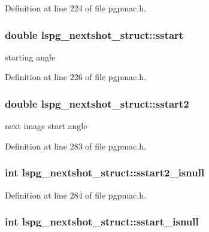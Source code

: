 Definition at line 224 of file pgpmac.\-h.

\hypertarget{structlspg__nextshot__struct_a8dc11eaa094d59f61642c4abc226918f}{
\subsubsection[{sstart}]{\setlength{\rightskip}{0pt plus 5cm}double lspg\-\_\-nextshot\-\_\-struct\-::sstart}}\label{structlspg__nextshot__struct_a8dc11eaa094d59f61642c4abc226918f}


starting angle 



Definition at line 226 of file pgpmac.\-h.

\hypertarget{structlspg__nextshot__struct_a8445cbd2206dc6d62b6bd433f5218c98}{
\subsubsection[{sstart2}]{\setlength{\rightskip}{0pt plus 5cm}double lspg\-\_\-nextshot\-\_\-struct\-::sstart2}}\label{structlspg__nextshot__struct_a8445cbd2206dc6d62b6bd433f5218c98}


next image start angle 



Definition at line 283 of file pgpmac.\-h.

\hypertarget{structlspg__nextshot__struct_a240c8532d5ce48dbc872d5123a4e721c}{
\subsubsection[{sstart2\-\_\-isnull}]{\setlength{\rightskip}{0pt plus 5cm}int lspg\-\_\-nextshot\-\_\-struct\-::sstart2\-\_\-isnull}}\label{structlspg__nextshot__struct_a240c8532d5ce48dbc872d5123a4e721c}


Definition at line 284 of file pgpmac.\-h.

\hypertarget{structlspg__nextshot__struct_aa53094de91e2f69d7174ab119df1cdac}{
\subsubsection[{sstart\-\_\-isnull}]{\setlength{\rightskip}{0pt plus 5cm}int lspg\-\_\-nextshot\-\_\-struct\-::sstart\-\_\-isnull}}\label{structlspg__nextshot__struct_aa53094de91e2f69d7174ab119df1cdac}


